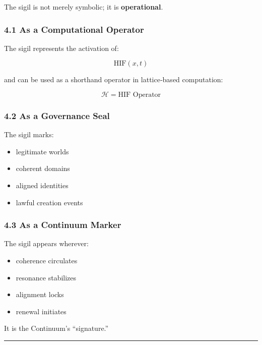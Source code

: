 The sigil is not merely symbolic; it is \textbf{operational}.

\subsubsection{4.1 As a Computational Operator}\label{as-a-computational-operator}

The sigil represents the activation of:

\[
\text{HIF}(x,t)
\]

and can be used as a shorthand operator in lattice‑based computation:

\[
\mathcal{H} = \text{HIF Operator}
\]

\subsubsection{4.2 As a Governance Seal}\label{as-a-governance-seal}

The sigil marks:

\begin{itemize}
\tightlist
\item
  legitimate worlds\\
\item
  coherent domains\\
\item
  aligned identities\\
\item
  lawful creation events
\end{itemize}

\subsubsection{4.3 As a Continuum Marker}\label{as-a-continuum-marker}

The sigil appears wherever:

\begin{itemize}
\tightlist
\item
  coherence circulates\\
\item
  resonance stabilizes\\
\item
  alignment locks\\
\item
  renewal initiates
\end{itemize}

It is the Continuum's ``signature.''

\begin{center}\rule{0.5\linewidth}{0.5pt}\end{center}

